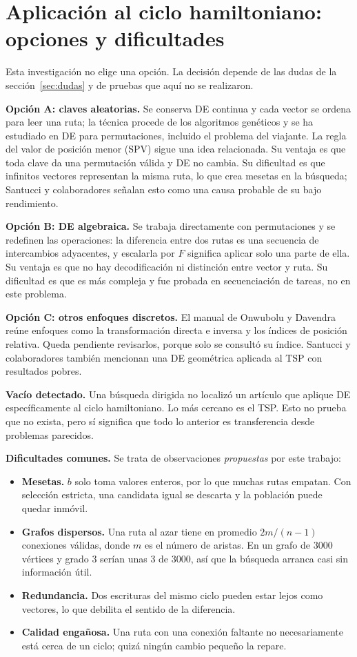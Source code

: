 \documentclass[letterpaper,12pt]{report}
\begin{document}
\section{Aplicación al ciclo hamiltoniano: opciones y dificultades}\label{sec:opciones}
Esta investigación no elige una opción. La decisión depende de las dudas de la sección~\ref{sec:dudas} y de pruebas que aquí no se realizaron.

\textbf{Opción A: claves aleatorias.} Se conserva DE continua y cada vector se ordena para leer una ruta; la técnica procede de los algoritmos genéticos y se ha estudiado en DE para permutaciones, incluido el problema del viajante. La regla del valor de posición menor (SPV) sigue una idea relacionada. Su ventaja es que toda clave da una permutación válida y DE no cambia. Su dificultad es que infinitos vectores representan la misma ruta, lo que crea mesetas en la búsqueda; Santucci y colaboradores señalan esto como una causa probable de su bajo rendimiento.

\textbf{Opción B: DE algebraica.} Se trabaja directamente con permutaciones y se redefinen las operaciones: la diferencia entre dos rutas es una secuencia de intercambios adyacentes, y escalarla por $F$ significa aplicar solo una parte de ella. Su ventaja es que no hay decodificación ni distinción entre vector y ruta. Su dificultad es que es más compleja y fue probada en secuenciación de tareas, no en este problema.

\textbf{Opción C: otros enfoques discretos.} El manual de Onwubolu y Davendra reúne enfoques como la transformación directa e inversa y los índices de posición relativa. Queda pendiente revisarlos, porque solo se consultó su índice. Santucci y colaboradores también mencionan una DE geométrica aplicada al TSP con resultados pobres.

\textbf{Vacío detectado.} Una búsqueda dirigida no localizó un artículo que aplique DE específicamente al ciclo hamiltoniano. Lo más cercano es el TSP. Esto no prueba que no exista, pero sí significa que todo lo anterior es transferencia desde problemas parecidos.

\textbf{Dificultades comunes.} Se trata de observaciones \emph{propuestas} por este trabajo:
\begin{itemize}[leftmargin=*]
\item \textbf{Mesetas.} $b$ solo toma valores enteros, por lo que muchas rutas empatan. Con selección estricta, una candidata igual se descarta y la población puede quedar inmóvil.
\item \textbf{Grafos dispersos.} Una ruta al azar tiene en promedio $2m/(n-1)$ conexiones válidas, donde $m$ es el número de aristas. En un grafo de 3000 vértices y grado 3 serían unas 3 de 3000, así que la búsqueda arranca casi sin información útil.
\item \textbf{Redundancia.} Dos escrituras del mismo ciclo pueden estar lejos como vectores, lo que debilita el sentido de la diferencia.
\item \textbf{Calidad engañosa.} Una ruta con una conexión faltante no necesariamente está cerca de un ciclo; quizá ningún cambio pequeño la repare.
\end{itemize}
\end{document}
